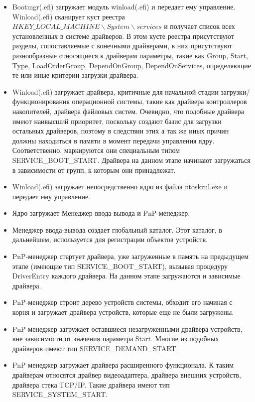 \documentclass[14pt,a4paper]{article}
\begin{document}
\begin{itemize}
    \item Bootmgr(.efi) загружает модуль winload(.efi) и передает ему управление.
    Winload(.efi) сканирует куст реестра \begin{math} HKEY\_LOCAL\_MACHINE \backslash System \backslash services \end{math} и получает список всех установленных в системе драйверов. В этом кусте реестра присутствуют разделы, сопоставляемые с конечными драйверами, в них присутствуют разнообразные относящиеся к драйверам параметры, такие как Group, Start, Type, LoadOrderGroup, DependOnGroup, DependOnServices, определяющие те или иные критерии загрузки драйвера.
    \item Winload(.efi) загружает драйвера, критичные для начальной стадии загрузки/функционирования операционной системы, такие как драйвера контроллеров накопителей, драйвера файловых систем. Очевидно, что подобные драйвера имеют наивысший приоритет, поскольку создают базис для загрузки остальных драйверов, поэтому в следствии этих а так же иных причин должны находиться в памяти в момент передачи управления ядру. Соответственно, маркируются они специальным типом SERVICE\_BOOT\_START. Драйвера на данном этапе начинают загружаться в зависимости от групп, к которым они принадлежат.
    \item Winload(.efi) загружает непосредственно ядро из файла ntoskrnl.exe и передает ему управление.
    \item Ядро загружает Менеджер ввода-вывода и PnP-менеджер.
    \item Менеджер ввода-вывода создает глобальный каталог. Этот каталог, в дальнейшем, используется для регистрации объектов устройств.
    \item PnP-менеджер стартует драйвера, уже загруженные в память на предыдущем этапе (имеющие тип SERVICE\_BOOT\_START), вызывая процедуру DriverEntry каждого драйвера. На данном этапе загружаются и зависимые драйвера.
    \item PnP-менеджер строит дерево устройств системы, обходит его начиная с корня и загружает драйвера устройств, которые еще не были загружены.
    \item PnP-менеджер загружает оставшиеся незагруженными драйвера устройств, вне зависимости от значения параметра Start. Многие из подобных драйверов имеют тип SERVICE\_DEMAND\_START.
    \item PnP менеджер загружает драйвера расширенного функционала. К таким драйверам относятся драйвер видеоадаптера, драйвера внешних устройств, драйвера стека TCP/IP. Такие драйвера имеют тип SERVICE\_SYSTEM\_START.

\end{itemize}
\end{document}
